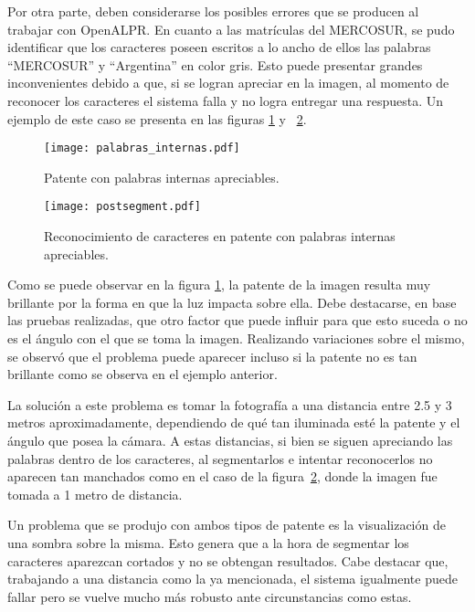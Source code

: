 Por otra parte, deben considerarse los posibles errores que se producen al trabajar con OpenALPR. En cuanto a las matrículas del MERCOSUR, se pudo identificar que los caracteres poseen escritos a lo ancho de ellos las palabras ``MERCOSUR'' y “Argentina” en color gris. Esto puede presentar grandes inconvenientes debido a que, si se logran apreciar en la imagen, al momento de reconocer los caracteres el sistema falla y no logra entregar una respuesta. Un ejemplo de este caso se presenta en las figuras \ref{fig:img_palabras_int} y ~\ref{fig:img_postsegment}.

\begin{figure}[H]
	\centering
	\texttt{[image: palabras\_internas.pdf]}
	\caption{Patente con palabras internas apreciables.}
	\label{fig:img_palabras_int}
\end{figure}
\begin{figure}[H]
	\centering
	\texttt{[image: postsegment.pdf]}
	\caption{Reconocimiento de caracteres en patente con palabras internas apreciables.}
	\label{fig:img_postsegment}
\end{figure}

Como se puede observar en la figura \ref{fig:img_palabras_int}, la patente de la imagen resulta muy brillante por la forma en que la luz impacta sobre ella. Debe destacarse, en base las pruebas realizadas, que otro factor que puede influir para que esto suceda o no es el ángulo con el que se toma la imagen. Realizando variaciones sobre el mismo, se observó que el problema puede aparecer incluso si la patente no es tan brillante como se observa en el ejemplo anterior.

La solución a este problema es tomar la fotografía a una distancia entre 2.5 y 3 metros aproximadamente, dependiendo de qué tan iluminada esté la patente y el ángulo que posea la cámara. A estas distancias, si bien se siguen apreciando las palabras dentro de los caracteres, al segmentarlos e intentar reconocerlos no aparecen tan manchados como en el caso de la figura~\ref{fig:img_postsegment}, donde la imagen fue tomada a 1 metro de distancia.

Un problema que se produjo con ambos tipos de patente es la visualización de una sombra sobre la misma. Esto genera que a la hora de segmentar los caracteres aparezcan cortados y no se obtengan resultados. Cabe destacar que, trabajando a una distancia como la ya mencionada, el sistema igualmente puede fallar pero se vuelve mucho más robusto ante circunstancias como estas.

